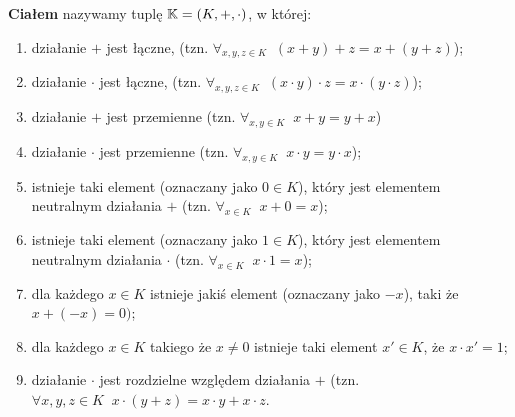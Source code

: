 \begin{definition}
\textbf{Ciałem} nazywamy tuplę \( \mathbb{K} = (K, +, \cdot) \), w której:

\begin{enumerate}
    \item działanie \( + \) jest łączne, (tzn. \(\forall_{x, y, z \in K} \; \;  (x + y) + z = x + (y + z) \));
    \item działanie \( \cdot \) jest łączne, (tzn. \(\forall_{x, y, z \in K} \; \;  (x \cdot y) \cdot z = x \cdot (y \cdot z) \));
    \item działanie \( + \) jest przemienne (tzn. \( \forall_{x, y \in K} \; \; x + y = y + x \))
    \item działanie \( \cdot \) jest przemienne (tzn. \( \forall_{x, y \in K} \; \; x \cdot y = y \cdot x \));
    \item istnieje taki element (oznaczany jako \(0 \in K\)), który jest elementem neutralnym działania \(+\) (tzn. \( \forall_{x \in K} \; \; x + 0 = x\));
    \item istnieje taki element (oznaczany jako \(1 \in K\)), który jest elementem neutralnym działania \(\cdot\) (tzn. \( \forall_{x \in K} \; \; x \cdot 1 = x\));
    \item dla każdego \( x \in K\) istnieje jakiś element (oznaczany jako \(-x\)), taki że \(x + (-x) = 0)\);
    \item dla każdego \( x \in K\) takiego że \( x \not= 0\) istnieje taki element \(x' \in K\), że \(x \cdot x' = 1\);
    \item działanie \( \cdot \) jest rozdzielne względem działania \( + \) (tzn. \( \forall{x,y,z \in K} \;\; x \cdot (y+z) =  x \cdot y + x \cdot z\).
    
\end{enumerate}

\end{definition}
